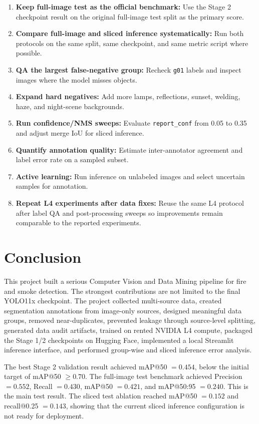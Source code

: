 \documentclass[12pt,a4paper]{report}
\newcommand{\code}[1]{\texttt{#1}}
\begin{document}
\begin{enumerate}
    \item \textbf{Keep full-image test as the official benchmark:} Use the Stage 2 checkpoint result on the original full-image test split as the primary score.
    \item \textbf{Compare full-image and sliced inference systematically:} Run both protocols on the same split, same checkpoint, and same metric script where possible.
    \item \textbf{QA the largest false-negative group:} Recheck \code{g01} labels and inspect images where the model misses objects.
    \item \textbf{Expand hard negatives:} Add more lamps, reflections, sunset, welding, haze, and night-scene backgrounds.
    \item \textbf{Run confidence/NMS sweeps:} Evaluate \code{report\_conf} from 0.05 to 0.35 and adjust merge IoU for sliced inference.
    \item \textbf{Quantify annotation quality:} Estimate inter-annotator agreement and label error rate on a sampled subset.
    \item \textbf{Active learning:} Run inference on unlabeled images and select uncertain samples for annotation.
    \item \textbf{Repeat L4 experiments after data fixes:} Reuse the same L4 protocol after label QA and post-processing sweeps so improvements remain comparable to the reported experiments.
\end{enumerate}

\chapter{Conclusion}
This project built a serious Computer Vision and Data Mining pipeline for fire and smoke detection. The strongest contributions are not limited to the final YOLO11x checkpoint. The project collected multi-source data, created segmentation annotations from image-only sources, designed meaningful data groups, removed near-duplicates, prevented leakage through source-level splitting, generated data audit artifacts, trained on rented NVIDIA L4 compute, packaged the Stage 1/2 checkpoints on Hugging Face, implemented a local Streamlit inference interface, and performed group-wise and sliced inference error analysis.

The best Stage 2 validation result achieved mAP@50 \(=0.454\), below the initial target of mAP@50 \(\geq 0.70\). The full-image test benchmark achieved Precision \(=0.552\), Recall \(=0.430\), mAP@50 \(=0.421\), and mAP@50:95 \(=0.240\). This is the main test result. The sliced test ablation reached mAP@50 \(=0.152\) and recall@0.25 \(=0.143\), showing that the current sliced inference configuration is not ready for deployment.
\end{document}
